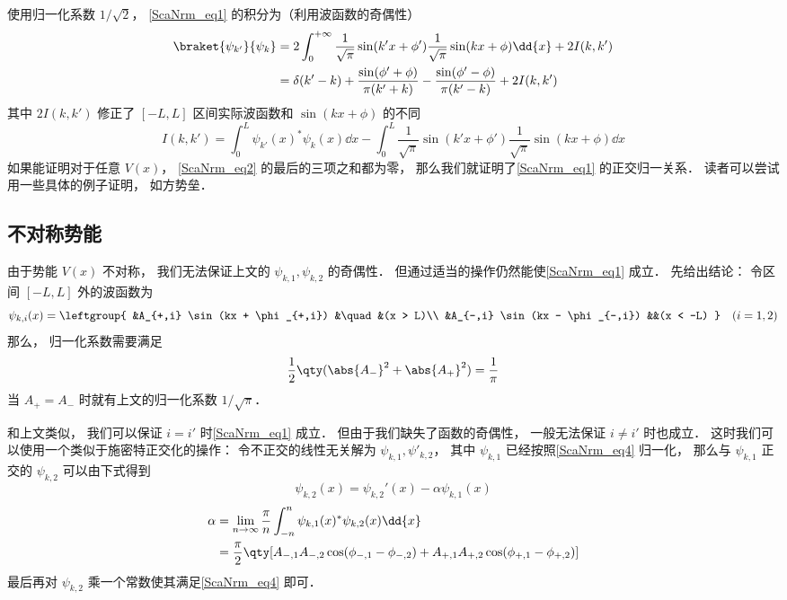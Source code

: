 使用归一化系数 $1/\sqrt{2}$， \autoref{ScaNrm_eq1} 的积分为（利用波函数的奇偶性）
\begin{equation}\label{ScaNrm_eq2}
\begin{aligned}
\braket{\psi_{k'}}{\psi_k} &= 2\int_{0}^{+\infty} \frac{1}{\sqrt{\pi}}\sin(k'x+\phi')\frac{1}{\sqrt{\pi}}\sin(kx+\phi) \dd{x} + 2I(k,k')\\
&= \delta(k'-k) + \frac{\sin(\phi'+\phi)}{\pi(k'+k)} - \frac{\sin(\phi'-\phi)}{\pi(k'-k)} + 2I(k,k')
\end{aligned}
\end{equation}
其中 $2I(k,k')$ 修正了 $[-L,L]$ 区间实际波函数和 $\sin(kx+\phi)$ 的不同
\begin{equation}
I(k,k') = \int_0^L \psi_{k'}(x)^* \psi_k(x) \dd{x}
-\int_{0}^{L} \frac{1}{\sqrt{\pi}}\sin(k'x+\phi') \frac{1}{\sqrt{\pi}}\sin(kx+\phi) \dd{x}
\end{equation}
如果能证明对于任意 $V(x)$， \autoref{ScaNrm_eq2} 的最后的三项之和都为零， 那么我们就证明了\autoref{ScaNrm_eq1} 的正交归一关系． 读者可以尝试用一些具体的例子证明， 如方势垒．

\subsection{不对称势能}
由于势能 $V(x)$ 不对称， 我们无法保证上文的 $\psi_{k,1},\psi_{k,2}$ 的奇偶性． 但通过适当的操作仍然能使\autoref{ScaNrm_eq1} 成立． 先给出结论： 令区间 $[-L,L]$ 外的波函数为
\begin{equation}
\psi_{k,i}(x) = \leftgroup{
    &A_{+,i} \sin(kx + \phi_{+,i}) &\quad &(x > L)\\
    &A_{-,i} \sin(kx - \phi_{-,i}) &&(x < -L)
} \quad (i = 1,2)
\end{equation}
那么， 归一化系数需要满足
\begin{equation}\label{ScaNrm_eq4}
\frac{1}{2}\qty(\abs{A_-}^2 + \abs{A_+}^2) = \frac{1}{\pi}
\end{equation}
当 $A_+ = A_-$ 时就有上文的归一化系数 $1/\sqrt{\pi}$．

和上文类似， 我们可以保证 $i = i'$ 时\autoref{ScaNrm_eq1} 成立． 但由于我们缺失了函数的奇偶性， 一般无法保证 $i \ne i'$ 时也成立． 这时我们可以使用一个类似于施密特正交化的操作： 令不正交的线性无关解为 $\psi_{k,1}, \psi'_{k,2}$， 其中 $\psi_{k,1}$ 已经按照\autoref{ScaNrm_eq4} 归一化， 那么与 $\psi_{k,1}$ 正交的 $\psi_{k,2}$ 可以由下式得到
\begin{equation}
\psi_{k,2}(x) = \psi_{k,2}'(x) - \alpha \psi_{k,1}(x)
\end{equation}
\begin{equation}\label{ScaNrm_eq5}
\begin{aligned}
\alpha &= \lim_{n\to\infty} \frac{\pi}{n} \int_{-n}^n \psi_{k,1}(x)^* \psi_{k,2}(x) \dd{x}\\
&= \frac{\pi}{2} \qty[A_{-,1}A_{-,2}\cos(\phi_{-,1}-\phi_{-,2}) + A_{+,1}A_{+,2}\cos(\phi_{+,1}-\phi_{+,2})]
\end{aligned}
\end{equation}
最后再对 $\psi_{k,2}$ 乘一个常数使其满足\autoref{ScaNrm_eq4} 即可．

